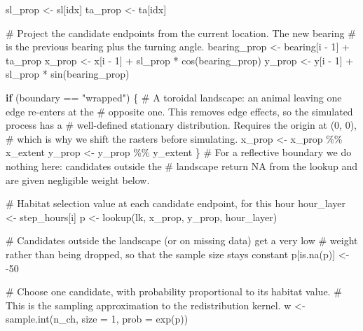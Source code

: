 \documentclass[
  letterpaper,
  DIV=11,
  numbers=noendperiod]{scrartcl}
\newenvironment{Shaded}{\begin{snugshade}}{\end{snugshade}}
\newcommand{\AttributeTok}[1]{\textcolor[rgb]{0.40,0.45,0.13}{#1}}
\newcommand{\CommentTok}[1]{\textcolor[rgb]{0.37,0.37,0.37}{#1}}
\newcommand{\ControlFlowTok}[1]{\textcolor[rgb]{0.00,0.23,0.31}{\textbf{#1}}}
\newcommand{\DecValTok}[1]{\textcolor[rgb]{0.68,0.00,0.00}{#1}}
\newcommand{\FunctionTok}[1]{\textcolor[rgb]{0.28,0.35,0.67}{#1}}
\newcommand{\NormalTok}[1]{\textcolor[rgb]{0.00,0.23,0.31}{#1}}
\newcommand{\OtherTok}[1]{\textcolor[rgb]{0.00,0.23,0.31}{#1}}
\newcommand{\SpecialCharTok}[1]{\textcolor[rgb]{0.37,0.37,0.37}{#1}}
\newcommand{\StringTok}[1]{\textcolor[rgb]{0.13,0.47,0.30}{#1}}
\begin{document}
\begin{Shaded}
\begin{Highlighting}[]
\NormalTok{    sl\_prop }\OtherTok{\textless{}{-}}\NormalTok{ sl[idx]}
\NormalTok{    ta\_prop }\OtherTok{\textless{}{-}}\NormalTok{ ta[idx]}

    \CommentTok{\# Project the candidate endpoints from the current location. The new bearing}
    \CommentTok{\# is the previous bearing plus the turning angle.}
\NormalTok{    bearing\_prop }\OtherTok{\textless{}{-}}\NormalTok{ bearing[i }\SpecialCharTok{{-}} \DecValTok{1}\NormalTok{] }\SpecialCharTok{+}\NormalTok{ ta\_prop}
\NormalTok{    x\_prop }\OtherTok{\textless{}{-}}\NormalTok{ x[i }\SpecialCharTok{{-}} \DecValTok{1}\NormalTok{] }\SpecialCharTok{+}\NormalTok{ sl\_prop }\SpecialCharTok{*} \FunctionTok{cos}\NormalTok{(bearing\_prop)}
\NormalTok{    y\_prop }\OtherTok{\textless{}{-}}\NormalTok{ y[i }\SpecialCharTok{{-}} \DecValTok{1}\NormalTok{] }\SpecialCharTok{+}\NormalTok{ sl\_prop }\SpecialCharTok{*} \FunctionTok{sin}\NormalTok{(bearing\_prop)}

    \ControlFlowTok{if}\NormalTok{ (boundary }\SpecialCharTok{==} \StringTok{"wrapped"}\NormalTok{) \{}
      \CommentTok{\# A toroidal landscape: an animal leaving one edge re{-}enters at the}
      \CommentTok{\# opposite one. This removes edge effects, so the simulated process has a}
      \CommentTok{\# well{-}defined stationary distribution. Requires the origin at (0, 0),}
      \CommentTok{\# which is why we shift the rasters before simulating.}
\NormalTok{      x\_prop }\OtherTok{\textless{}{-}}\NormalTok{ x\_prop }\SpecialCharTok{\%\%}\NormalTok{ x\_extent}
\NormalTok{      y\_prop }\OtherTok{\textless{}{-}}\NormalTok{ y\_prop }\SpecialCharTok{\%\%}\NormalTok{ y\_extent}
\NormalTok{    \}}
    \CommentTok{\# For a reflective boundary we do nothing here: candidates outside the}
    \CommentTok{\# landscape return NA from the lookup and are given negligible weight below.}

    \CommentTok{\# Habitat selection value at each candidate endpoint, for this hour}
\NormalTok{    hour\_layer }\OtherTok{\textless{}{-}}\NormalTok{ step\_hours[i]}
\NormalTok{    p }\OtherTok{\textless{}{-}} \FunctionTok{lookup}\NormalTok{(lk, x\_prop, y\_prop, hour\_layer)}

    \CommentTok{\# Candidates outside the landscape (or on missing data) get a very low}
    \CommentTok{\# weight rather than being dropped, so that the sample size stays constant}
\NormalTok{    p[}\FunctionTok{is.na}\NormalTok{(p)] }\OtherTok{\textless{}{-}} \SpecialCharTok{{-}}\DecValTok{50}

    \CommentTok{\# Choose one candidate, with probability proportional to its habitat value.}
    \CommentTok{\# This is the sampling approximation to the redistribution kernel.}
\NormalTok{    w }\OtherTok{\textless{}{-}} \FunctionTok{sample.int}\NormalTok{(n\_ch, }\AttributeTok{size =} \DecValTok{1}\NormalTok{, }\AttributeTok{prob =} \FunctionTok{exp}\NormalTok{(p))}


\end{Highlighting}
\end{Shaded}
\end{document}

